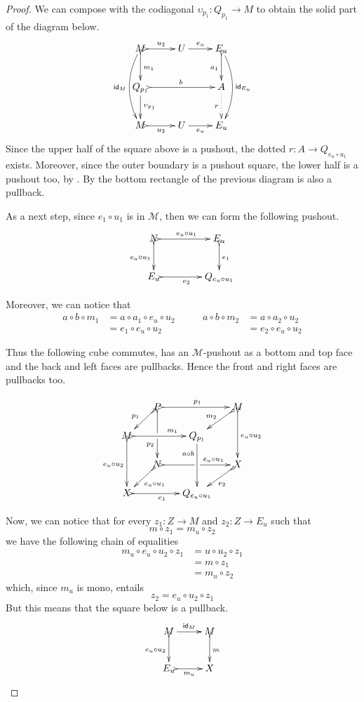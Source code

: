 \begin{proof}
	We can compose with the codiagonal $\upsilon_{p_1}\colon Q_{p_1}\to M$ to obtain the solid part of the diagram below.
	\[\xymatrix{M \ar@/_.4cm/[dd]_{\id{M}}\ar@{>->}[r]^{u_2} \ar@{>->}[d]^{m_1} & U \ar[r]^-{e_u} & E_u \ar@{>->}[d]_{a_1} \ar@/^.4cm/[dd]^{\id{E_u}} \\
		Q_{p_1} \ar[d]^{\upsilon_{p_1}} \ar@{>->}[rr]^{b}&& A \ar@{.>}[d]_{r} \\ M\ar@{>->}[r]_{u_2} & U\ar[r]_-{e_u}&E_u}\]	
	Since the upper half of the square above is a pushout, the dotted $r\colon A\to Q_{e_u\circ u_1}$ exists. Moreover, since the outer boundary is a pushout square, the lower half is a pushout too, by . By  the bottom rectangle of the previous diagram is also a pullback.
	
	As a next step, since $e_1\circ u_1$ is in $\mathcal{M}$, then we can form the following pushout. 
	\[\xymatrix@C=40pt{N \ar@{>->}[r]^{e_u\circ u_1} \ar@{>->}[d]_{e_u\circ u_1}& E_u\ar@{>->}[d]^{e_1}\\
		E_u \ar@{>->}[r]_{e_2}& Q_{e_u\circ u_1} }\]
		
		Moreover, we can notice that
		\[\begin{split}
		a\circ b \circ m_1&=a\circ a_1\circ e_u\circ u_2\\&=e_1\circ e_u\circ u_2
		\end{split}\qquad \begin{split}
		a\circ b \circ m_2&=a\circ a_2\circ u_2\\&=e_2\circ e_u\circ u_2
		\end{split}\]
	
	Thus the following cube commutes, has an $\mathcal{M}$-pushout as a bottom and top face and the back and left faces are pullbacks. Hence the front and right faces are pullbacks too. 
	
	\[\xymatrix@C=15pt@R=15pt{&P\ar@{>->}[dd]|\hole_(.65){p_2}\ar@{>->}[rr]^{p_1} \ar@{>->}[dl]_{p_1} && M \ar@{>->}[dd]^{e_u\circ u_2} \ar@{>->}[dl]_{m_2}\\ M  \ar@{>->}[dd]_{e_u\circ u_2}\ar@{>->}[rr]^(.65){m_1} & & Q_{p_1}\ar[dd]_(.3){a\circ b}\\&N\ar@{>->}[rr]|\hole^(.7){e_u\circ u_1} \ar@{>->}[dl]^{e_u\circ u_1} && X \ar@{>->}[dl]^{e_2} \\X \ar@{>->}[rr]_{e_1} & & Q_{e_u\circ u_1}}\]
	
	Now, we can notice that for every $z_1\colon  Z\to M$ and $z_2\colon Z\to E_u$ such that 
	\[m\circ z_1=m_u\circ z_2\]
	we have the following chain of equalities
	\begin{align*}
		m_u\circ e_u\circ u_2\circ z_1&=u\circ u_2\circ z_1\\&=m\circ z_1\\&=m_u\circ z_2 
	\end{align*}
	which, since $m_u$ is mono, entails
	\[z_2=e_u\circ u_2\circ z_1\]
	But this means that the square below is a pullback. 
	\[\xymatrix{M \ar[r]^{\id{M}} \ar@{>->}[d]_{e_u\circ u_2}& M \ar@{>->}[d]^{m}\\ E_u \ar@{>->}[r]_{m_u} & X}\] 
	

\end{proof}
